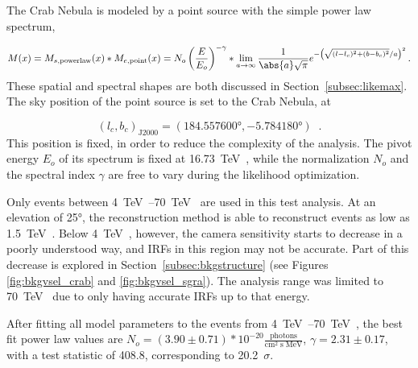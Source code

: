 The Crab Nebula is modeled by a point source with the simple power law spectrum,

\begin{equation}\label{eqn:crab_model}
  M(\xtrue) = M_{s,\textrm{powerlaw}}(\xtrue) * M_{e,\textrm{point}}(\xtrue) = N_o \left ( \frac{\Etrue}{E_o} \right )^{-\gamma} * \lim_{a\to\infty} \frac{1}{ \abs{a} \sqrt{\pi} } e^{ - \left ( \sqrt{ (\ltrue-l_c)^2 + (\btrue-b_c)^2 }/a \right )^2 } \,.
\end{equation}
These spatial and spectral shapes are both discussed in Section~\ref{subsec:likemax}.
The sky position of the point source is set to the Crab Nebula, at

$$(l_c,b_c)_{\textrm{J2000}} = (\ang{184.557600},\ang{-5.784180}) \;\;.$$
This position is fixed, in order to reduce the complexity of the analysis.
The pivot energy $E_o$ of its spectrum is fixed at \SI{16.73}{\TeV{}}, while the normalization $N_o$ and the spectral index $\gamma$ are free to vary during the likelihood optimization.

Only events between \SIrange{4}{70}{\TeV{}} are used in this test analysis.
At an elevation of \ang{25}, the reconstruction method is able to reconstruct events as low as \SI{1.5}{\TeV{}}.
Below \SI{4}{\TeV{}}, however, the camera sensitivity starts to decrease in a poorly understood way, and IRFs in this region may not be accurate.
Part of this decrease is explored in Section~\ref{subsec:bkgstructure} (see Figures \ref{fig:bkgvsel_crab} and \ref{fig:bkgvsel_sgra}).
The analysis range was limited to \SI{70}{\TeV{}} due to only having accurate IRFs up to that energy.
  
After fitting all model parameters to the events from \SIrange{4}{70}{\TeV{}}, the best fit power law values are $ N_o = \left(3.90\pm0.71\right)*10^{-20} \frac{\textrm{photons}}{\textrm{cm}^{2} \; \textrm{s} \; \textrm{MeV} } $, $ \gamma = 2.31 \pm 0.17 $, with a test statistic of 408.8, corresponding to \nicetilde{}\SI{20.2}{$\sigma$}.


